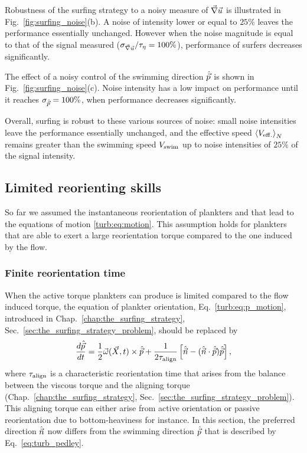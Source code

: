 Robustness of the surfing strategy to a noisy measure of $\vec{\nabla} \vec{u}$ is illustrated in Fig.~\ref{fig:surfing_noise}(b).
A noise of intensity lower or equal to $25\%$ leaves the performance essentially unchanged. 
However when the noise magnitude is equal to that of the signal measured ($\sigma_{\vec{\nabla} \vec{u}}/\tau_{\eta} = 100\%$), performance of surfers decreases significantly.

The effect of a noisy control of the swimming direction $\hat{\vec{p}}$ is shown in Fig.~\ref{fig:surfing_noise}(c).
Noise intensity has a low impact on performance until it reaches $\sigma_{\hat{\vec{p}}} = 100\%$, when performance decreases significantly.

Overall, surfing is robust to these various sources of noise: small noise intensities leave the performance essentially unchanged, and the effective speed $\left\langle V_{\mathrm{eff.}} \right\rangle_N$ remains greater than the swimming speed $V_{\mathrm{swim}}$ up to noise intensities of $25\%$ of the signal intensity.

\subsection{Limited reorienting skills}\label{sec:surfing_on_turbulence_rtime}

So far we assumed the instantaneous reorientation of plankters and that lead to the equations of motion \eqref{turb:eq:motion}.
This assumption holds for plankters that are able to exert a large reorientation torque compared to the one induced by the flow.

\subsubsection{Finite reorientation time}

When the active torque plankters can produce is limited compared to the flow induced torque, the equation of plankter orientation, Eq.~\eqref{turb:eq:p_motion}, introduced in Chap.~\ref{chap:the_surfing_strategy}, Sec.~\ref{sec:the_surfing_strategy_problem}, should be replaced by \citep{Pedley1992}
\begin{equation}\label{eq:turb_pedley}
		\frac{d \hat{\vec{p}}}{d t}  =
		\frac{1}{2} \vec{\omega} (\vec{X}, t) \times \hat{\vec{p}} + \frac{1}{2 \tau_{\mathrm{align}}} \left[ \hat{\vec{n}} - (\hat{\vec{n}} \cdot \hat{\vec{p}}) \hat{\vec{p}} \right],
\end{equation}
where $\tau_{\mathrm{align}}$ is a characteristic reorientation time that arises from the balance between the viscous torque and the aligning torque (Chap.~\ref{chap:the_surfing_strategy}, Sec.~\ref{sec:the_surfing_strategy_problem}).
This aligning torque can either arise from active orientation or passive reorientation due to bottom-heaviness for instance.
In this section, the preferred direction $\hat{\vec{n}}$ now differs from the swimming direction $\hat{\vec{p}}$ that is described by Eq.~\eqref{eq:turb_pedley}.

